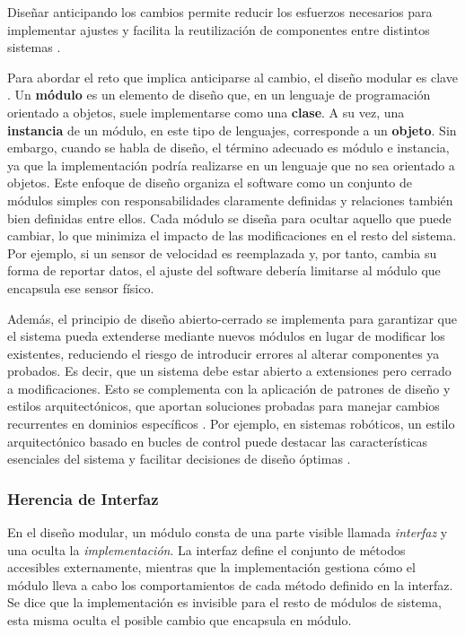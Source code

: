 Diseñar anticipando los cambios permite reducir los esfuerzos necesarios para implementar ajustes y facilita la reutilización de componentes entre distintos sistemas \cite{Parnas02, DBLP:books/daglib/0019719}.

Para abordar el reto que implica anticiparse al cambio, el diseño modular es clave \cite{Parnas1972}.
Un \textbf{módulo} es un elemento de diseño que, en un lenguaje de programación orientado a objetos, suele implementarse como una \textbf{clase}. A su vez, una \textbf{instancia} de un módulo, en este tipo de lenguajes, corresponde a un \textbf{objeto}. Sin embargo, cuando se habla de diseño, el término adecuado es módulo e instancia, ya que la implementación podría realizarse en un lenguaje que no sea orientado a objetos. Este enfoque de diseño organiza el software como un conjunto de módulos simples con responsabilidades claramente definidas y relaciones también bien definidas entre ellos. Cada módulo se diseña para ocultar aquello que puede cambiar, lo que minimiza el impacto de las modificaciones en el resto del sistema. Por ejemplo, si un sensor de velocidad es reemplazada y, por tanto, cambia su forma de reportar datos, el ajuste del software debería limitarse al módulo que encapsula ese sensor físico.

Además, el principio de diseño abierto-cerrado \cite{DBLP:books/ph/Meyer97} se implementa para garantizar que el sistema pueda extenderse mediante nuevos módulos en lugar de modificar los existentes, reduciendo el riesgo de introducir errores al alterar componentes ya probados. Es decir, que un sistema debe estar abierto a extensiones pero cerrado a modificaciones. Esto se complementa con la aplicación de patrones de diseño y estilos arquitectónicos, que aportan soluciones probadas para manejar cambios recurrentes en dominios específicos \cite{Gamma:1995:DPE:186897, DBLP:books/lib/BuschmannHS07}. Por ejemplo, en sistemas robóticos, un estilo arquitectónico basado en bucles de control puede destacar las características esenciales del sistema y facilitar decisiones de diseño óptimas \cite{ShawGarlan1996}.

\subsubsection*{Herencia de Interfaz}
En el diseño modular, un módulo consta de una parte visible llamada \textit{interfaz} y una oculta la \textit{implementación}. La interfaz define el conjunto de métodos accesibles externamente, mientras que la implementación gestiona cómo el módulo lleva a cabo los comportamientos de cada método definido en la interfaz. Se dice que la implementación es invisible para el resto de módulos de sistema, esta misma oculta el posible cambio que encapsula en módulo.

